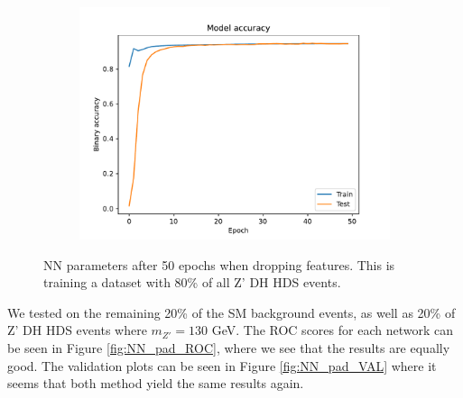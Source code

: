 \documentclass[12pt, a4paper]{book}
\begin{document}
\begin{figure}[!ht]
\begin{subfigure}[b]{0.49\textwidth}
      \includegraphics[width=1\textwidth]{No_pad/Binary_accuracy.pdf}
   \end{subfigure}
   \caption[NN parameters after 50 epochs when dropping features]{NN parameters after 50 epochs when dropping features.  This is training a dataset with 80\% of all Z' DH HDS events.}\label{fig:NN_stats_no_pad}
\end{figure}
\clearpage\noindent We tested on the remaining 20\% of the SM background events, as well as 20\% of Z' DH HDS events where $m_{Z'} =130$ GeV. The ROC scores for each network can be seen in Figure \ref{fig:NN_pad_ROC}, where we see that 
the results are equally good. The validation plots can be seen in Figure \ref{fig:NN_pad_VAL} where it seems that both method yield the same results again.
\end{document}
